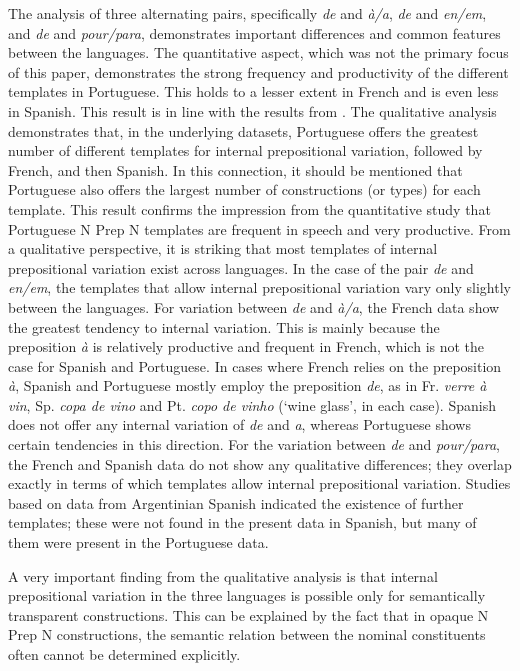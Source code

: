 \documentclass[output=paper]{langsci/langscibook}
\begin{document}
The analysis of three alternating pairs, specifically \textit{de} and\textit{ à/a}, \textit{de} and \textit{en/em}, and \textit{de} and \textit{pour/para}, demonstrates important differences and common features between the languages. The quantitative aspect, which was not the primary focus of this paper, demonstrates the strong frequency and productivity of the different templates in Portuguese. This holds to a lesser extent in French and is even less in Spanish. This result is in line with the results from \citet{Hennecke:2017}. The qualitative analysis demonstrates that, in the underlying datasets, Portuguese offers the greatest number of different templates for internal prepositional variation, followed by French, and then Spanish. In this connection, it should be mentioned that Portuguese also offers the largest number of constructions (or types) for each template. This result confirms the impression from the quantitative study that Portuguese N Prep N templates are frequent in speech and very productive. From a qualitative perspective, it is striking that most templates of internal prepositional variation exist across languages. In the case of the pair \textit{de} and \textit{en/em}, the templates that allow internal prepositional variation vary only slightly between the languages. For variation between \textit{de} and \textit{à/a}, the French data show the greatest tendency to internal variation. This is mainly because the preposition \textit{à} is relatively productive and frequent in French, which is not the case for Spanish and Portuguese. In cases where French relies on the preposition \textit{à}, Spanish and Portuguese mostly employ the preposition \textit{de}, as in Fr. \textit{verre à vin}, Sp. \textit{copa de vino} and Pt. \textit{copo de vinho} (`wine glass', in each case). Spanish does not offer any internal variation of \textit{de} and \textit{a}, whereas Portuguese shows certain tendencies in this direction. For the variation between \textit{de} and \textit{pour/para}, the French and Spanish data do not show any qualitative differences; they overlap exactly in terms of which templates allow internal prepositional variation. Studies based on data from Argentinian Spanish indicated the existence of further templates; these were not found in the present data in Spanish, but many of them were present in the Portuguese data.

A very important finding from the qualitative analysis is that internal prepositional variation in the three languages is possible only for semantically transparent constructions. This can be explained by the fact that in opaque N Prep N constructions, the semantic relation between the nominal constituents often cannot be determined explicitly.
\end{document}
